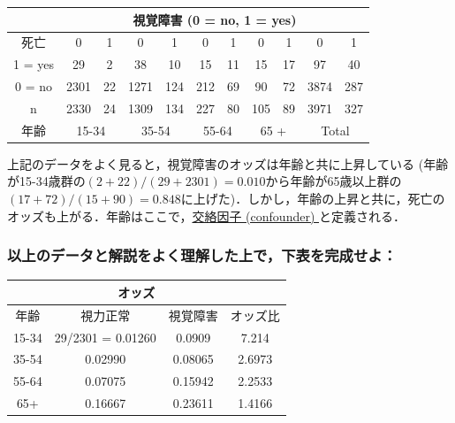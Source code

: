 \documentclass[11pt,]{problemset}
\begin{document}
\begin{center}
\begin{tabular}{|c|c|c|c|c|c|c|c|c|c|c|}
\hline
       & \multicolumn{10}{c|}{視覚障害 (0 = no, 1 = yes)}                                                                                                  \\ \hline
死亡     & 0             & 1          & 0            & 1           & 0            & 1           & 0           & 1           & 0            & 1           \\ \hline
1 = yes & 29            & 2          & 38           & 10          & 15           & 11          & 15          & 17          & 97           & 40          \\ \hline
0 = no & 2301          & 22         & 1271         & 124         & 212          & 69          & 90          & 72          & 3874         & 287         \\ \hline
  n     & 2330          &  24         & 1309         & 134         & 227          & 80          & 105          & 89          & 3971         & 327         \\ \hline
年齢     & \multicolumn{2}{c|}{15-34} & \multicolumn{2}{c|}{35-54} & \multicolumn{2}{c|}{55-64} & \multicolumn{2}{c|}{65 +} & \multicolumn{2}{c|}{Total} \\ \hline
\end{tabular}
\end{center}

上記のデータをよく見ると，視覚障害のオッズは年齢と共に上昇している
(年齢が15-34歳群の\((2 + 22) / (29 + 2301) = 0.010\)から年齢が65歳以上群の\((17+72)/(15+90) = 0.848\)に上げた)．しかし，年齢の上昇と共に，死亡のオッズも上がる．年齢はここで，\underline{交絡因子 (confounder) }と定義される．

\subsubsection{以上のデータと解説をよく理解した上で，下表を完成せよ：}

\begin{center}
\begin{tabular}{|c|c|c|c|}
\hline
      & \multicolumn{2}{c|}{オッズ}    &        \\ \hline
年齢    & 視力正常              & 視覚障害    & オッズ比   \\ \hline
15-34 & 29/2301 = 0.01260 & 0.0909  & 7.214  \\ \hline
35-54 & 0.02990           & 0.08065 & 2.6973 \\ \hline
55-64 & 0.07075           & 0.15942 & 2.2533 \\ \hline
65+   & 0.16667           & 0.23611 & 1.4166 \\ \hline
\end{tabular}
\end{center}
\end{document}
